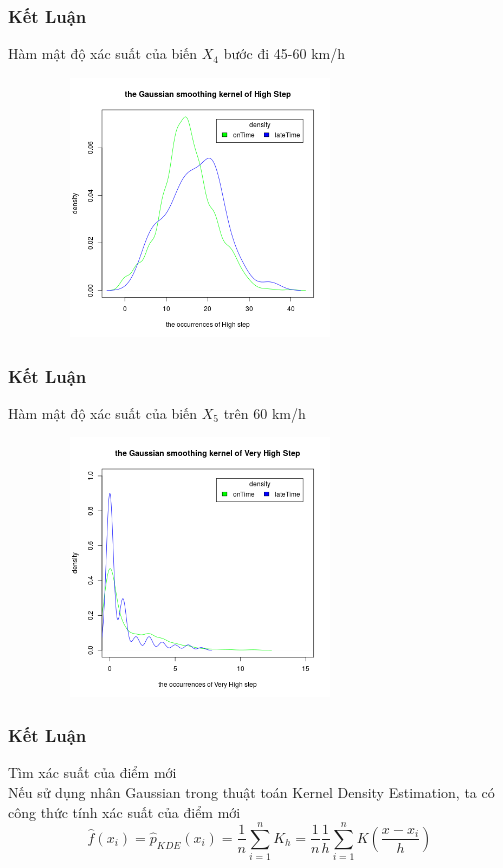 \documentclass[t]{beamer}
\begin{document}
\begin{frame}
\frametitle{Kết Luận}
Hàm mật độ xác suất của biến $X_4$ bước đi 45-60 km/h
\begin{center}
\includegraphics[height=2.7in,width=4in]{DensityHighStep.png}
\end{center}
\end{frame}

\begin{frame}
\frametitle{Kết Luận}
Hàm mật độ xác suất của biến $X_5$ trên 60 km/h
\begin{center}
\includegraphics[height=2.7in,width=4in]{DensityVeryHighStep.png}
\end{center}
\end{frame}

\begin{frame}
\frametitle{Kết Luận}
Tìm xác suất của điểm mới\\
Nếu sử dụng nhân Gaussian trong thuật toán Kernel Density Estimation, ta có công thức tính xác suất của điểm mới
\[
\hat{f}(x_i) = \hat{p}_{KDE}(x_i) = \frac{1}{n}\sum_{i=1}^{n} K_h = \frac{1}{n}\frac{1}{h}\sum_{i=1}^{n} K(\frac{x-x_i}{h})
\]
\end{frame}
\end{document}
